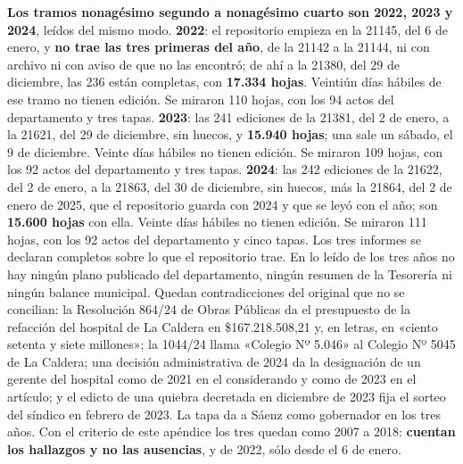 \textbf{Los tramos nonagésimo segundo a nonagésimo cuarto son 2022, 2023 y 2024}, leídos del mismo modo. \textbf{2022}: el repositorio empieza en la 21145, del 6 de enero, y \textbf{no trae las tres primeras del año}, de la 21142 a la 21144, ni con archivo ni con aviso de que no las encontró; de ahí a la 21380, del 29 de diciembre, las 236 están completas, con \textbf{17.334 hojas}. Veintiún días hábiles de ese tramo no tienen edición. Se miraron 110 hojas, con los 94 actos del departamento y tres tapas. \textbf{2023}: las 241 ediciones de la 21381, del 2 de enero, a la 21621, del 29 de diciembre, sin huecos, y \textbf{15.940 hojas}; una sale un sábado, el 9 de diciembre. Veinte días hábiles no tienen edición. Se miraron 109 hojas, con los 92 actos del departamento y tres tapas. \textbf{2024}: las 242 ediciones de la 21622, del 2 de enero, a la 21863, del 30 de diciembre, sin huecos, más la 21864, del 2 de enero de 2025, que el repositorio guarda con 2024 y que se leyó con el año; son \textbf{15.600 hojas} con ella. Veinte días hábiles no tienen edición. Se miraron 111 hojas, con los 92 actos del departamento y cinco tapas. Los tres informes se declaran completos sobre lo que el repositorio trae. En lo leído de los tres años no hay ningún plano publicado del departamento, ningún resumen de la Tesorería ni ningún balance municipal. Quedan contradicciones del original que no se concilian: la Resolución 864/24 de Obras Públicas da el presupuesto de la refacción del hospital de La Caldera en \$167.218.508,21 y, en letras, en «ciento setenta y siete millones»; la 1044/24 llama «Colegio Nº 5.046» al Colegio Nº 5045 de La Caldera; una decisión administrativa de 2024 da la designación de un gerente del hospital como de 2021 en el considerando y como de 2023 en el artículo; y el edicto de una quiebra decretada en diciembre de 2023 fija el sorteo del síndico en febrero de 2023. La tapa da a Sáenz como gobernador en los tres años. Con el criterio de este apéndice los tres quedan como 2007 a 2018: \textbf{cuentan los hallazgos y no las ausencias}, y de 2022, sólo desde el 6 de enero.

